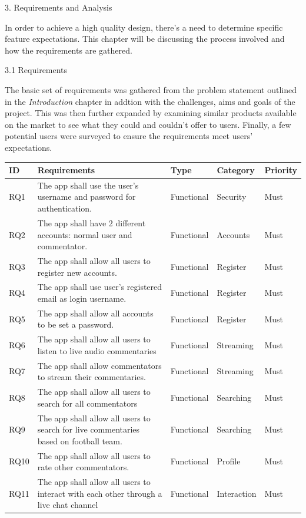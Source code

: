 \documentclass{article}
\begin{document}
\begin{flushleft}
\newpage
{\huge 3. Requirements and Analysis}\par
In order to achieve a high quality design, there's a need to determine specific feature expectations. This chapter will be discussing the process involved and how the requirements are gathered.\par
{\Large 3.1 Requirements}\par
The basic set of requirements was gathered from the problem statement outlined in the \textit{Introduction} chapter in addtion with the challenges, aims and goals of the project. This was then further expanded by examining similar products available on the market to see what they could and couldn't offer to users. Finally, a few potential users  were surveyed to ensure the requirements meet users' expectations.
\begin{longtable}[t]{| p{1cm} | p{6cm} | p{1.8cm} | p{2cm} | p{1.2cm} |}
\hline
ID & Requirements & Type & Category & Priority \\
\hline
RQ1 & The app shall use the user's username and password for authentication. & Functional & Security & Must\\
\hline
RQ2 & The app shall have 2 different accounts: normal user and commentator. & Functional & Accounts & Must\\
\hline
RQ3 & The app shall allow all users to register new accounts. & Functional & Register & Must\\
\hline
RQ4 & The app shall use user's registered email as login username. & Functional & Register & Must\\
\hline
RQ5 & The app shall allow all accounts to be set a password. & Functional & Register & Must\\
\hline
RQ6 & The app shall allow all users to listen to live audio commentaries & Functional & Streaming & Must\\
\hline
RQ7 & The app shall allow commentators to stream their commentaries. & Functional & Streaming & Must\\
\hline
RQ8 & The app shall allow all users to search for all commentators & Functional & Searching & Must\\
\hline
RQ9 & The app shall allow all users to search for live commentaries based on football team. & Functional & Searching & Must\\
\hline
RQ10 & The app shall allow all users to rate other commentators. & Functional & Profile & Must\\
\hline
RQ11 & The app shall allow all users to interact with each other through a live chat channel & Functional & Interaction & Must\\

\end{longtable}
\end{flushleft}
\end{document}
